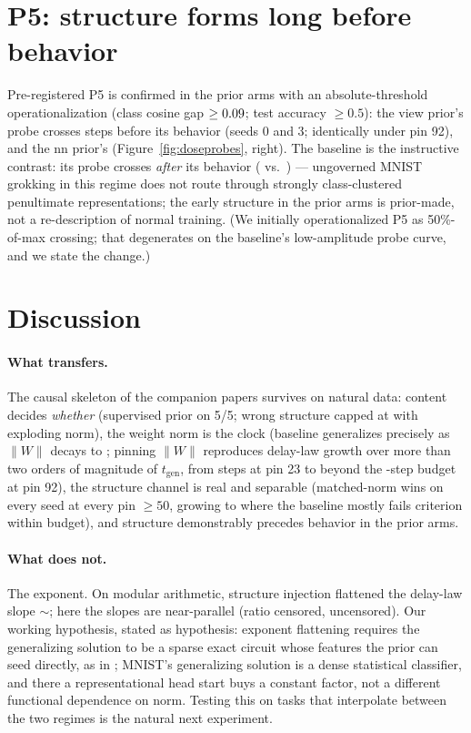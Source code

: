 \documentclass[11pt]{article}
\newcommand{\tgen}{t_{\mathrm{gen}}}
\newcommand{\W}{\lVert W\rVert}
\begin{document}
\section{P5: structure forms long before behavior}
\label{sec:probes}

Pre-registered P5 is confirmed in the prior arms with an absolute-threshold operationalization
(class cosine gap $\geq 0.09$; test accuracy $\geq 0.5$): the view prior's probe
crosses \pfProbeLeadAug{} steps before its behavior (seeds 0 and 3; identically under pin 92),
and the nn prior's \pfProbeLeadNn{} (Figure~\ref{fig:doseprobes}, right). The baseline is the
instructive contrast: its probe crosses \emph{after} its behavior (\pfBaseProbeCross{} vs.\
\pfBaseAccCross) --- ungoverned MNIST grokking in this regime does not route through strongly
class-clustered penultimate representations; the early structure in the prior arms is
prior-made, not a re-description of normal training. (We initially operationalized P5 as
50\%-of-max crossing; that degenerates on the baseline's low-amplitude probe curve, and we
state the change.)

\section{Discussion}
\label{sec:disc}

\paragraph{What transfers.} The causal skeleton of the companion papers survives on natural
data: content decides \emph{whether} (supervised prior \pfLabelMedSpeed{} on 5/5; wrong
structure capped at \pfShufCeilRange{} with exploding norm), the weight norm is the clock
(baseline generalizes precisely as $\W$ decays to \pfBaseNormAtGen; pinning $\W$ reproduces
delay-law growth over more than two orders of magnitude of $\tgen$, from \pfClampFloor{} steps
at pin 23 to beyond the \pfBudget-step budget at pin 92), the structure channel is real and
separable (matched-norm wins on every seed at every pin $\geq 50$, growing to
\pfRatioCNinetyTwo{} where the baseline mostly fails criterion within budget), and structure
demonstrably precedes behavior in the prior arms.

\paragraph{What does not.} The exponent. On modular arithmetic, structure injection flattened
the delay-law slope ${\sim}$\pfAlgFlatten; here the slopes are near-parallel
(ratio \pfSlopeRatio{} censored, \pfSlopeRatioEighty{} uncensored). Our working hypothesis, stated as hypothesis: exponent
flattening requires the generalizing solution to be a sparse exact circuit whose features the
prior can seed directly, as in \citep{nanda2023progress,gromov2023grokking}; MNIST's
generalizing solution is a dense statistical classifier, and there a representational head
start buys a constant factor, not a different functional dependence on norm. Testing this on
tasks that interpolate between the two regimes is the natural next experiment.
\end{document}
